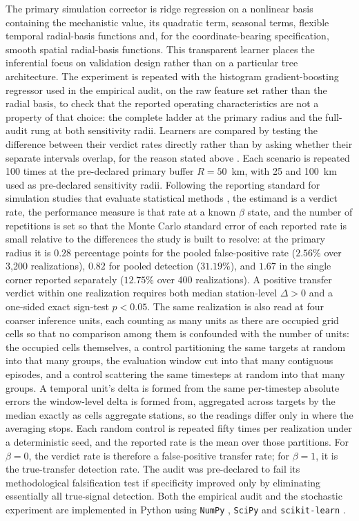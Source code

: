 The primary simulation corrector is ridge regression on a nonlinear basis containing the mechanistic value, its quadratic term, seasonal terms, flexible temporal radial-basis functions and, for the coordinate-bearing specification, smooth spatial radial-basis functions. This transparent learner places the inferential focus on validation design rather than on a particular tree architecture. The experiment is repeated with the histogram gradient-boosting regressor used in the empirical audit, on the raw feature set rather than the radial basis, to check that the reported operating characteristics are not a property of that choice: the complete ladder at the primary radius and the full-audit rung at both sensitivity radii. Learners are compared by testing the difference between their verdict rates directly rather than by asking whether their separate intervals overlap, for the reason stated above \citep{gelman2006}. Each scenario is repeated 100 times at the pre-declared primary buffer $R=50$~km, with 25 and 100~km used as pre-declared sensitivity radii. Following the reporting standard for simulation studies that evaluate statistical methods \citep{morris2019simstudies}, the estimand is a verdict rate, the performance measure is that rate at a known $\beta$ state, and the number of repetitions is set so that the Monte Carlo standard error of each reported rate is small relative to the differences the study is built to resolve: at the primary radius it is $0.28$ percentage points for the pooled false-positive rate ($2.56\%$ over 3{,}200 realizations), $0.82$ for pooled detection ($31.19\%$), and $1.67$ in the single corner reported separately ($12.75\%$ over 400 realizations). A positive transfer verdict within one realization requires both median station-level $\Delta>0$ and a one-sided exact sign-test $p<0.05$. The same realization is also read at four coarser inference units, each counting as many units as there are occupied grid cells so that no comparison among them is confounded with the number of units: the occupied cells themselves, a control partitioning the same targets at random into that many groups, the evaluation window cut into that many contiguous episodes, and a control scattering the same timesteps at random into that many groups. A temporal unit's delta is formed from the same per-timestep absolute errors the window-level delta is formed from, aggregated across targets by the median exactly as cells aggregate stations, so the readings differ only in where the averaging stops. Each random control is repeated fifty times per realization under a deterministic seed, and the reported rate is the mean over those partitions. For $\beta=0$, the verdict rate is therefore a false-positive transfer rate; for $\beta=1$, it is the true-transfer detection rate. The audit was pre-declared to fail its methodological falsification test if specificity improved only by eliminating essentially all true-signal detection. Both the empirical audit and the stochastic experiment are implemented in Python using \texttt{NumPy} \citep{harris2020numpy}, \texttt{SciPy} \citep{virtanen2020scipy} and \texttt{scikit-learn} \citep{pedregosa2011}.

